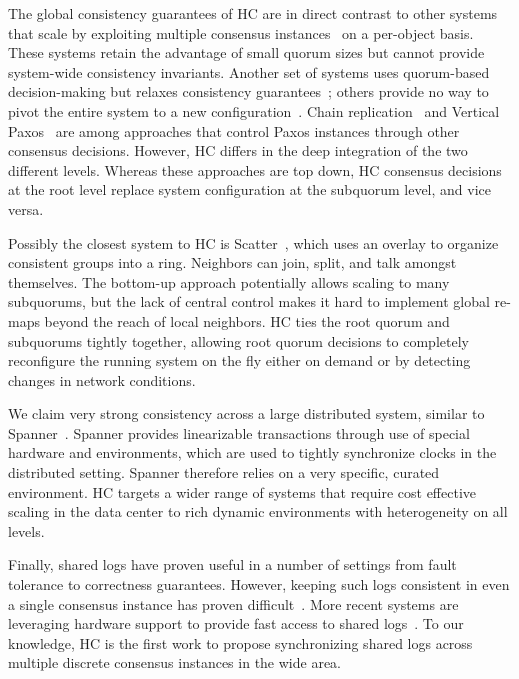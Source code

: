 The global consistency guarantees of HC are in direct contrast to other systems that scale by exploiting multiple consensus instances~\cite{bigtable,mdcc,spanner} on a per-object basis.
These systems retain the advantage of small quorum sizes but cannot provide system-wide consistency invariants.
Another set of systems uses quorum-based decision-making but relaxes consistency guarantees~\cite{dynamo,pnuts,cops}; others provide no way to pivot the entire system to a new configuration~\cite{scatter}.
Chain replication~\cite{van2004chain} and Vertical Paxos~\cite{vertical_paxos} are among approaches that control Paxos instances through other consensus decisions.
However, HC differs in the deep integration of the two different levels.
Whereas these approaches are top down, HC consensus decisions at the root level replace system configuration at the subquorum level, and vice versa.

Possibly the closest system to HC is Scatter~\cite{scatter}, which uses an overlay to organize consistent groups into a ring.
Neighbors can join, split, and talk amongst themselves. The bottom-up approach potentially allows scaling to many subquorums, but the lack of central control makes it hard to implement global re-maps beyond the reach of local neighbors.
HC ties the root quorum and subquorums tightly together, allowing root quorum decisions to completely reconfigure the running system on the fly either on demand or by detecting changes in network conditions.

We claim very strong consistency across a large distributed system, similar to Spanner~\cite{spanner}.
Spanner provides linearizable  transactions through use of special hardware and environments, which are used to tightly synchronize clocks in the distributed setting.
Spanner therefore relies on a very specific, curated environment. HC targets a wider range of systems that require cost effective scaling in the data center to rich dynamic environments with heterogeneity on all levels.

Finally, shared logs have proven useful in a number of settings from fault tolerance to correctness guarantees.
However, keeping such logs consistent in even a single consensus instance has proven difficult~\cite{chubby,gfs,zookeeper}.
More recent systems are leveraging hardware support to provide fast access to shared logs~\cite{vcorfu,tango,calvindb,calvinfs,hyder-a,fawn}.
To our knowledge, HC is the first work to propose synchronizing shared logs across multiple discrete consensus instances in the wide area.

